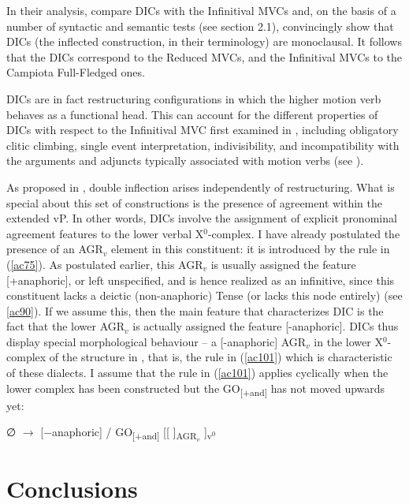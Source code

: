 \documentclass[output=paper]{langscibook}
\begin{document}
In their analysis, \citet{cardinaletti2001a} compare DICs with the Infinitival MVCs and, on the basis of a number of syntactic and semantic tests (see section 2.1), convincingly show that DICs (the inflected construction, in their terminology) are monoclausal. It follows that the DICs correspond to the Reduced MVCs, and the Infinitival MVCs to the Campiota Full-Fledged ones.

DICs are in fact restructuring configurations in which the higher motion verb behaves as a functional head. This can account for the different properties of DICs with respect to the Infinitival MVC first examined in \citet{cardinaletti2001a}, including obligatory clitic climbing, single event interpretation, indivisibility, and incompatibility with the arguments and adjuncts typically associated with motion verbs (see \citealt{cardinaletti2001a, cardinaletti2003a, manzini2005a, cruschina2013a, caro2019a}).

As proposed in \citet{cruschina2021a}, double inflection arises independently of restructuring. What is special about this set of constructions is the presence of agreement within the extended vP. In other words, DICs involve the assignment of explicit pronominal agreement features to the lower verbal X$^0$-complex. I have already postulated the presence of an  AGR$_v$ element in this constituent: it is introduced by the rule in (\ref{ac75}).  As postulated earlier, this AGR$_v$ is usually assigned the feature [+anaphoric], or left unspecified, and is hence realized as an infinitive, since this constituent lacks a deictic (non-anaphoric) Tense (or lacks this node entirely) (see \ref{ac90}). If we assume this, then the main feature that characterizes DIC is the fact that the lower AGR$_v$ is actually assigned the feature [-anaphoric]. DICs thus display special morphological behaviour  --  a [-anaphoric] AGR$_v$ in the lower X$^0$-complex of the structure in , that is, the rule in (\ref{ac101}) which is characteristic of these dialects. I assume that the rule in (\ref{ac101}) applies cyclically when the lower complex has been constructed but the GO\textsubscript{[+and]} has not moved upwards yet:

\ea \label{ac101}∅ $\rightarrow$ [−anaphoric] /  GO\textsubscript{[+and]} [[ \underline{\hspace{3em}} ]\textsubscript{AGR$_v$} ]\textsubscript{v$^0$}
\z

\section{Conclusions}
\end{document}
